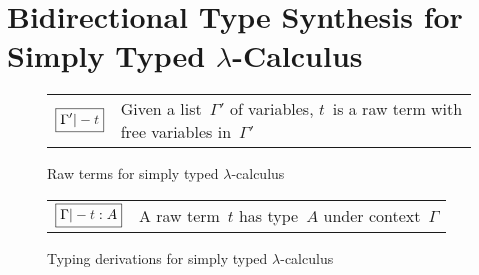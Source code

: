 
\section{Bidirectional Type Synthesis for Simply Typed $\lambda$-Calculus} \label{sec:key-ideas}

\begin{figure}
  \small
  \bgroup
  \renewcommand{\arraystretch}{1.5}
  \begin{tabular}{ r l }
    $\boxed{\Gamma' |- \isTerm{t}}$ & Given a list~$\Gamma'$ of variables, $t$~is a raw term with free variables in~$\Gamma'$
  \end{tabular}
  \egroup
  \centering
  \caption{Raw terms for simply typed $\lambda$-calculus}
  \label{fig:STLC-raw-terms}
\end{figure}

\begin{figure}
  \small
  \bgroup
  \renewcommand{\arraystretch}{1.5}
  \begin{tabular}{ r l }
    $\boxed{\Gamma |- \isTerm{t} : A}$ & A raw term~$t$ has type~$A$ under context~$\Gamma$
  \end{tabular}
  \egroup
  \centering
  \caption{Typing derivations for simply typed $\lambda$-calculus}
  \label{fig:STLC-typing-derivations}
\end{figure}

